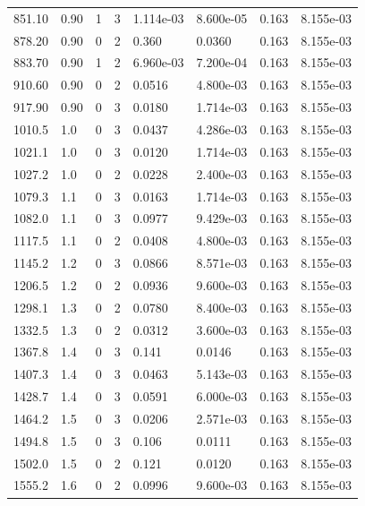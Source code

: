 \documentclass[preview]{standalone}
\begin{document}
{{{\begin{tabular}{L{1.2cm}C{1.2cm} C{0.3cm}C{0.5cm} C{1.4cm}C{1.4cm} C{1.4cm}C{1.4cm}}
  851.10  &  0.90  & 1     &  3 &  1.114e-03  & 8.600e-05  & 0.163 &  8.155e-03   \\ 
  878.20  &  0.90  & 0     &  2 &  0.360  & 0.0360  & 0.163 &  8.155e-03   \\ 
  883.70  &  0.90  & 1     &  2 &  6.960e-03  & 7.200e-04  & 0.163 &  8.155e-03   \\ 
  910.60  &  0.90  & 0     &  2 &  0.0516  & 4.800e-03  & 0.163 &  8.155e-03   \\ 
  917.90  &  0.90  & 0     &  3 &  0.0180  & 1.714e-03  & 0.163 &  8.155e-03   \\ 
  1010.5  &   1.0  & 0     &  3 &  0.0437  & 4.286e-03  & 0.163 &  8.155e-03   \\ 
  1021.1  &   1.0  & 0     &  3 &  0.0120  & 1.714e-03  & 0.163 &  8.155e-03   \\ 
  1027.2  &   1.0  & 0     &  2 &  0.0228  & 2.400e-03  & 0.163 &  8.155e-03   \\ 
  1079.3  &   1.1  & 0     &  3 &  0.0163  & 1.714e-03  & 0.163 &  8.155e-03   \\ 
  1082.0  &   1.1  & 0     &  3 &  0.0977  & 9.429e-03  & 0.163 &  8.155e-03   \\ 
  1117.5  &   1.1  & 0     &  2 &  0.0408  & 4.800e-03  & 0.163 &  8.155e-03   \\ 
  1145.2  &   1.2  & 0     &  3 &  0.0866  & 8.571e-03  & 0.163 &  8.155e-03   \\ 
  1206.5  &   1.2  & 0     &  2 &  0.0936  & 9.600e-03  & 0.163 &  8.155e-03   \\ 
  1298.1  &   1.3  & 0     &  2 &  0.0780  & 8.400e-03  & 0.163 &  8.155e-03   \\ 
  1332.5  &   1.3  & 0     &  2 &  0.0312  & 3.600e-03  & 0.163 &  8.155e-03   \\ 
  1367.8  &   1.4  & 0     &  3 &  0.141  & 0.0146  & 0.163 &  8.155e-03   \\ 
  1407.3  &   1.4  & 0     &  3 &  0.0463  & 5.143e-03  & 0.163 &  8.155e-03   \\ 
  1428.7  &   1.4  & 0     &  3 &  0.0591  & 6.000e-03  & 0.163 &  8.155e-03   \\ 
  1464.2  &   1.5  & 0     &  3 &  0.0206  & 2.571e-03  & 0.163 &  8.155e-03   \\ 
  1494.8  &   1.5  & 0     &  3 &  0.106  & 0.0111  & 0.163 &  8.155e-03   \\ 
  1502.0  &   1.5  & 0     &  2 &  0.121  & 0.0120  & 0.163 &  8.155e-03   \\ 
  1555.2  &   1.6  & 0     &  2 &  0.0996  & 9.600e-03  & 0.163 &  8.155e-03   \\ 

\end{tabular}}}}
\end{document}
